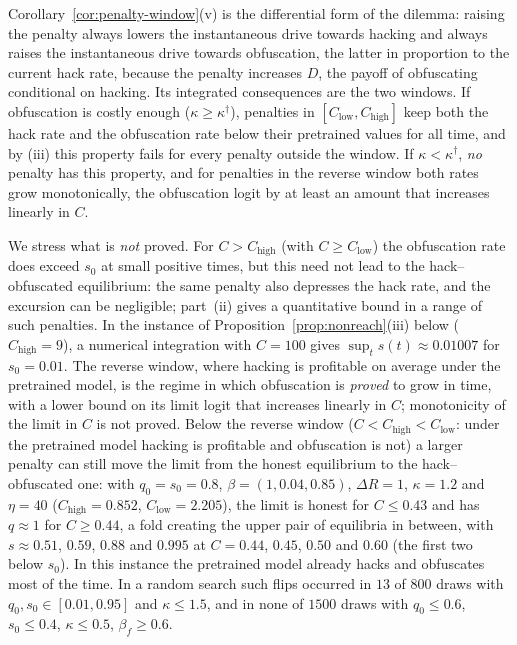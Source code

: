 \begin{remark}
\label{rem:dilemma}
Corollary~\ref{cor:penalty-window}(v) is the differential form of the
dilemma: raising the penalty always lowers the instantaneous drive towards
hacking and always raises the instantaneous drive towards obfuscation, the
latter in proportion to the current hack rate, because the penalty
increases $D$, the payoff of obfuscating conditional on hacking. Its
integrated consequences are the two windows. If obfuscation is costly
enough ($\kappa\ge\kappa^\dagger$), penalties in
$[C_{\mathrm{low}},C_{\mathrm{high}}]$ keep both the hack rate and the
obfuscation rate below their pretrained values for all time, and by
(iii) this property fails for every penalty outside the window. If
$\kappa<\kappa^\dagger$, \emph{no} penalty has this property, and for
penalties in the reverse window both rates grow monotonically, the
obfuscation logit by at least an amount that increases linearly in $C$.

We stress what is \emph{not} proved. For $C>C_{\mathrm{high}}$ (with
$C\ge C_{\mathrm{low}}$) the obfuscation rate does exceed $s_0$ at small
positive times, but this need not lead to the hack--obfuscated equilibrium:
the same penalty also depresses the hack rate, and the excursion can be
negligible; part~(ii) gives a quantitative bound in a range of such
penalties. In the instance of Proposition~\ref{prop:nonreach}(iii) below
($C_{\mathrm{high}}=9$), a numerical integration with $C=100$ gives
$\sup_ts(t)\approx0.01007$ for $s_0=0.01$. The reverse window, where hacking is profitable on average under the pretrained model, is the regime in which obfuscation is \emph{proved} to grow in time, with a lower bound on its limit logit that increases linearly in $C$; monotonicity of the limit in $C$ is not proved. Below the reverse window ($C<C_{\mathrm{high}}<C_{\mathrm{low}}$: under the pretrained model hacking is profitable and obfuscation is not) a larger penalty can still move the limit from the honest equilibrium to the hack--obfuscated one: with $q_0=s_0=0.8$, $\beta=(1,0.04,0.85)$, $\Delta R=1$, $\kappa=1.2$ and $\eta=40$ ($C_{\mathrm{high}}=0.852$, $C_{\mathrm{low}}=2.205$), the limit is honest for $C\le0.43$ and has $q\approx1$ for $C\ge0.44$, a fold creating the upper pair of equilibria in between, with $s\approx0.51$, $0.59$, $0.88$ and $0.995$ at $C=0.44$, $0.45$, $0.50$ and $0.60$ (the first two below $s_0$). In this instance the pretrained model already hacks and obfuscates most of the time. In a random search such flips occurred in $13$ of $800$ draws with $q_0,s_0\in[0.01,0.95]$ and $\kappa\le1.5$, and in none of $1500$ draws with $q_0\le0.6$, $s_0\le0.4$, $\kappa\le0.5$, $\beta_f\ge0.6$.
\end{remark}

